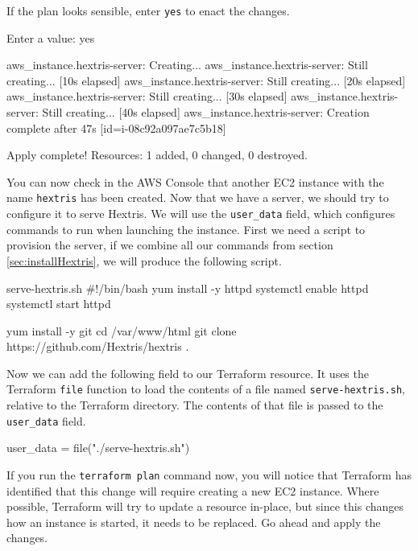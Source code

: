 \documentclass{csse4400}
\begin{document}
If the plan looks sensible, enter \texttt{yes} to enact the changes.

\begin{code}[numbers=none]{}
  Enter a value: yes

aws_instance.hextris-server: Creating...
aws_instance.hextris-server: Still creating... [10s elapsed]
aws_instance.hextris-server: Still creating... [20s elapsed]
aws_instance.hextris-server: Still creating... [30s elapsed]
aws_instance.hextris-server: Still creating... [40s elapsed]
aws_instance.hextris-server: Creation complete after 47s [id=i-08c92a097ae7c5b18]

Apply complete! Resources: 1 added, 0 changed, 0 destroyed.
\end{code}

You can now check in the AWS Console that another EC2 instance with the name \texttt{hextris} has been created.
Now that we have a server, we should try to configure it to serve Hextris.
We will use the \texttt{user\_data} field, which configures commands to run when launching the instance.
First we need a script to provision the server, if we combine all our commands from section \ref{sec:installHextris}, we will produce the following script.

\vspace{-1em}
\begin{code}[language=bash,numbers=none]{serve-hextris.sh}
#!/bin/bash
yum install -y httpd
systemctl enable httpd
systemctl start httpd

yum install -y git
cd /var/www/html
git clone https://github.com/Hextris/hextris .
\end{code}



Now we can add the following field to our Terraform resource.
It uses the Terraform \texttt{file} function to load the contents of a file named \texttt{serve-hextris.sh},
relative to the Terraform directory.
The contents of that file is passed to the \texttt{user\_data} field.

\begin{code}[language=terraform,numbers=none]{}
user_data = file("./serve-hextris.sh")
\end{code}

If you run the \texttt{terraform plan} command now,
you will notice that Terraform has identified that this change will require creating a new EC2 instance.
Where possible, Terraform will try to update a resource in-place,
but since this changes how an instance is started, it needs to be replaced.
Go ahead and apply the changes.
\end{document}
